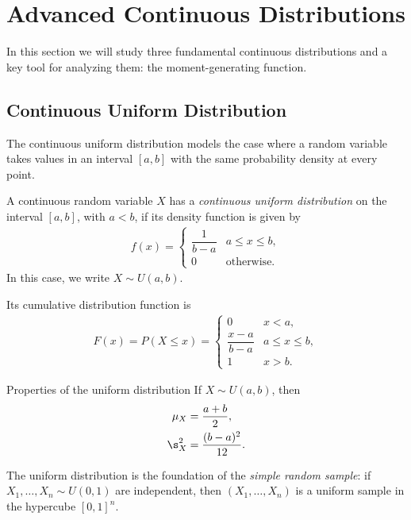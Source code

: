 \section{Advanced Continuous Distributions}

In this section we will study three fundamental continuous distributions and a key tool for analyzing them: the moment-generating function.

\subsection{Continuous Uniform Distribution}

The continuous uniform distribution models the case where a random variable takes values in an interval $[a,b]$ with the same probability density at every point.

\begin{definicion}
A continuous random variable $X$ has a \emph{continuous uniform distribution} on the interval $[a,b]$, with $a<b$, if its density function is given by
\begin{align}
 \label{eq:2.8.1}
 f(x) =
 \begin{cases}
  \dfrac{1}{b-a} & a \leq x \leq b, \\
  0 & \text{otherwise.}
 \end{cases}
\end{align}
In this case, we write $X \sim U(a,b)$.
\end{definicion}

Its cumulative distribution function is
\begin{align}
 \label{eq:2.8.2}
 F(x) = P(X \leq x) =
 \begin{cases}
  0 & x < a, \\
  \dfrac{x-a}{b-a} & a \leq x \leq b, \\
  1 & x > b.
 \end{cases}
\end{align}

{Properties of the uniform distribution} If $X \sim U(a,b)$, then
\begin{align}
 \mu_X &= \frac{a+b}{2}, \\
 \s_X^2 &= \frac{(b-a)^2}{12}.
\end{align}

\begin{observacion}
The uniform distribution is the foundation of the \emph{simple random sample}: if $X_1,\dots,X_n \sim U(0,1)$ are independent, then $(X_1,\dots,X_n)$ is a uniform sample in the hypercube $[0,1]^n$.
\end{observacion}

